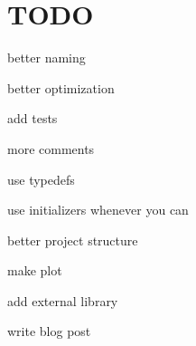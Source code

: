 \section*{T\+O\+DO}


\begin{DoxyItemize}
\item better naming
\item better optimization
\item add tests
\item more comments
\item use typedefs
\item use initializers whenever you can
\item better project structure
\item make plot
\item add external library
\item write blog post 
\end{DoxyItemize}